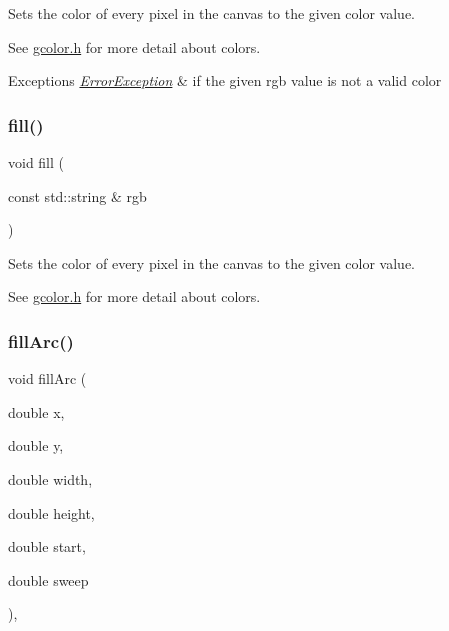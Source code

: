 Sets the color of every pixel in the canvas to the given color value. 

See \mbox{\hyperlink{gcolor_8h_source}{gcolor.\+h}} for more detail about colors. 
\begin{DoxyExceptions}{Exceptions}
{\em \mbox{\hyperlink{classErrorException}{Error\+Exception}}} & if the given rgb value is not a valid color \\
\hline
\end{DoxyExceptions}
\mbox{\label{classGCanvas_a02a5aa7f1474eeedd181e6e46b5eee65}} 
\subsubsection{\texorpdfstring{fill()}{fill()}\hspace{0.1cm}{\footnotesize\ttfamily [2/2]}}
{\footnotesize\ttfamily void fill (\begin{DoxyParamCaption}\item[{const std\+::string \&}]{rgb }\end{DoxyParamCaption})\hspace{0.3cm}{\ttfamily [virtual]}}



Sets the color of every pixel in the canvas to the given color value. 

See \mbox{\hyperlink{gcolor_8h_source}{gcolor.\+h}} for more detail about colors. \mbox{\label{classGDrawingSurface_a228075ad18bd97b57f9956568c4773f3}} 
\subsubsection{\texorpdfstring{fill\+Arc()}{fillArc()}}
{\footnotesize\ttfamily void fill\+Arc (\begin{DoxyParamCaption}\item[{double}]{x,  }\item[{double}]{y,  }\item[{double}]{width,  }\item[{double}]{height,  }\item[{double}]{start,  }\item[{double}]{sweep }\end{DoxyParamCaption})\hspace{0.3cm}{\ttfamily [virtual]}, {\ttfamily [inherited]}}



